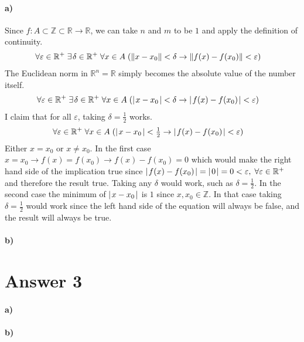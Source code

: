 \documentclass[12pt]{article}
\newcommand\+{\mkern2mu}
\let\eps\varepsilon
\begin{document}
\paragraph{a)}
Since $f: A \subset \mathbb{Z} \subset \mathbb{R} \rightarrow \mathbb{R}$, we can take $n$ and $m$ to be $1$ and apply the definition of continuity.
\begin{align*}
\forall \eps \in \mathbb{R}^+ \; \exists \+ \delta \in \mathbb{R}^+ \; \forall x \in A \; &(\Vert x - x_0 \Vert < \delta \rightarrow \Vert f(x) - f(x_0) \Vert < \eps)
\end{align*}
The Euclidean norm in $\mathbb{R}^n = \mathbb{R}$ simply becomes the absolute value of the number itself.
\begin{align*}
\forall \eps \in \mathbb{R}^+ \; \exists \+ \delta \in \mathbb{R}^+ \; \forall x \in A \; &(\vert \+ x - x_0 \+ \vert < \delta \rightarrow \vert \+ f(x) - f(x_0) \+ \vert < \eps)
\end{align*}
I claim that for all $\eps$, taking $\delta = \frac{1}{2}$ works.
\begin{align*}
\forall \eps \in \mathbb{R}^+ \; \forall x \in A \; &(\vert \+ x - x_0 \+ \vert < \tfrac{1}{2} \rightarrow \vert \+ f(x) - f(x_0) \+ \vert < \eps)
\end{align*}
Either $x = x_0$ or $x \neq x_0$.
In the first case $x = x_0 \rightarrow f(x) = f(x_0) \rightarrow f(x) - f (x_0) = 0$ which would make the right hand side of the implication true since $\vert \+ f(x) - f(x_0) \+ \vert = \vert \+ 0 \+ \vert = 0 < \eps, \; \forall \eps \in \mathbb{R}^+$ and therefore the result true.
Taking any $\delta$ would work, such as $\delta = \frac{1}{2}$.
In the second case the minimum of $\vert \+ x - x_0 \+ \vert$ is $1$ since $x, x_0 \in \mathbb{Z}$.
In that case taking $\delta = \frac{1}{2}$ would work since the left hand side of the equation will always be false, and the result will always be true.


\paragraph{b)}

\section*{Answer 3}
\paragraph{a)}
\paragraph{b)}
\end{document}
